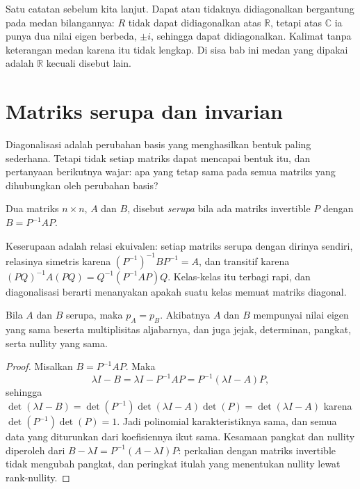 
Satu catatan sebelum kita lanjut. Dapat atau tidaknya didiagonalkan bergantung pada medan
bilangannya: $R$ tidak dapat didiagonalkan atas $\mathbb{R}$, tetapi atas $\mathbb{C}$ ia punya dua
nilai eigen berbeda, $\pm i$, sehingga dapat didiagonalkan. Kalimat tanpa keterangan medan karena
itu tidak lengkap. Di sisa bab ini medan yang dipakai adalah $\mathbb{R}$ kecuali disebut lain.

\section{Matriks serupa dan invarian}

Diagonalisasi adalah perubahan basis yang menghasilkan bentuk paling sederhana. Tetapi tidak
setiap matriks dapat mencapai bentuk itu, dan pertanyaan berikutnya wajar: apa yang tetap sama
pada semua matriks yang dihubungkan oleh perubahan basis?

\begin{definisi}
Dua matriks $n\times n$, $A$ dan $B$, disebut \emph{serupa} bila ada matriks invertible $P$
dengan $B=P^{-1}AP$.
\end{definisi}


Keserupaan adalah relasi ekuivalen: setiap matriks serupa dengan dirinya sendiri, relasinya
simetris karena $(P^{-1})^{-1}BP^{-1}=A$, dan transitif karena
$(PQ)^{-1}A(PQ)=Q^{-1}(P^{-1}AP)Q$. Kelas-kelas itu terbagi rapi, dan diagonalisasi berarti
menanyakan apakah suatu kelas memuat matriks diagonal.

\begin{proposisi}
Bila $A$ dan $B$ serupa, maka $p_{A}=p_{B}$. Akibatnya $A$ dan $B$ mempunyai nilai eigen yang
sama beserta multiplisitas aljabarnya, dan juga jejak, determinan, pangkat, serta nullity yang
sama.
\end{proposisi}

\begin{proof}
Misalkan $B=P^{-1}AP$. Maka
\[
  \lambda I-B=\lambda I-P^{-1}AP=P^{-1}(\lambda I-A)P,
\]
sehingga
$\det(\lambda I-B)=\det(P^{-1})\det(\lambda I-A)\det(P)=\det(\lambda I-A)$ karena
$\det(P^{-1})\det(P)=1$. Jadi polinomial karakteristiknya sama, dan semua data yang diturunkan
dari koefisiennya ikut sama. Kesamaan pangkat dan nullity diperoleh dari $B-\lambda I=
P^{-1}(A-\lambda I)P$: perkalian dengan matriks invertible tidak mengubah pangkat, dan peringkat
itulah yang menentukan nullity lewat rank-nullity.
\end{proof}

